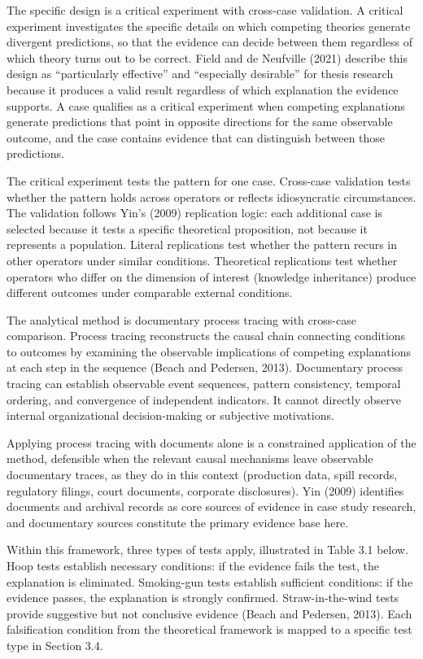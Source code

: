 \documentclass[twoside,fontset=lmodern]{mitthesis}
\begin{document}
The specific design is a critical experiment with cross-case validation.
A critical experiment investigates the specific details on which
competing theories generate divergent predictions, so that the evidence
can decide between them regardless of which theory turns out to be
correct. Field and de Neufville (2021) describe this design as
``particularly effective'' and ``especially desirable'' for thesis
research because it produces a valid result regardless of which
explanation the evidence supports. A case qualifies as a critical
experiment when competing explanations generate predictions that point
in opposite directions for the same observable outcome, and the case
contains evidence that can distinguish between those predictions.

The critical experiment tests the pattern for one case. Cross-case
validation tests whether the pattern holds across operators or reflects
idiosyncratic circumstances. The validation follows Yin's (2009)
replication logic: each additional case is selected because it tests a
specific theoretical proposition, not because it represents a
population. Literal replications test whether the pattern recurs in
other operators under similar conditions. Theoretical replications test
whether operators who differ on the dimension of interest (knowledge
inheritance) produce different outcomes under comparable external
conditions.

The analytical method is documentary process tracing with cross-case
comparison. Process tracing reconstructs the causal chain connecting
conditions to outcomes by examining the observable implications of
competing explanations at each step in the sequence (Beach and Pedersen,
2013). Documentary process tracing can establish observable event
sequences, pattern consistency, temporal ordering, and convergence of
independent indicators. It cannot directly observe internal
organizational decision-making or subjective motivations.

Applying process tracing with documents alone is a constrained
application of the method, defensible when the relevant causal
mechanisms leave observable documentary traces, as they do in this
context (production data, spill records, regulatory filings, court
documents, corporate disclosures). Yin (2009) identifies documents and
archival records as core sources of evidence in case study research, and
documentary sources constitute the primary evidence base here.

Within this framework, three types of tests apply, illustrated in Table
3.1 below. Hoop tests establish necessary conditions: if the evidence
fails the test, the explanation is eliminated. Smoking-gun tests
establish sufficient conditions: if the evidence passes, the explanation
is strongly confirmed. Straw-in-the-wind tests provide suggestive but
not conclusive evidence (Beach and Pedersen, 2013). Each falsification
condition from the theoretical framework is mapped to a specific test
type in Section 3.4.
\end{document}
